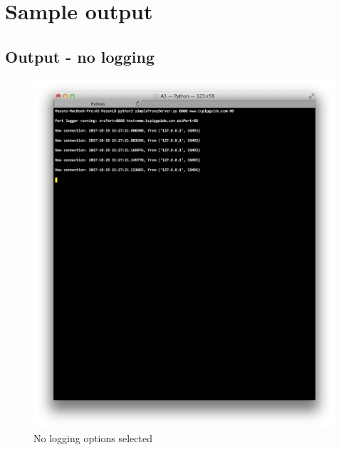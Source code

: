 \documentclass[11pt]{article}
\begin{document}
\section{Sample output}

	\subsection{Output - no logging}
	\begin{figure}[H]
	\includegraphics[scale=0.5, trim={0cm 0cm 0cm 0cm}, clip]{none_output}
	\caption{No logging options selected}
	\end{figure}
	
\end{document}
